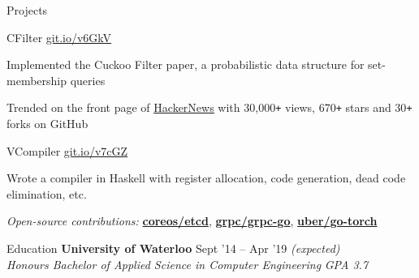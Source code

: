\documentclass{resume} %
\begin{document}
\begin{rSection}{Projects}
  \begin{rSubsection}{CFilter}
    {\href{https://git.io/v6GkV}{git.io/v6GkV}}
                     {}{}
     \item Implemented the Cuckoo Filter paper, a probabilistic data structure for
       set-membership queries
     \item Trended on the front page of
       \href{https://news.ycombinator.com/item?id=12241332}{\underline
       {HackerNews}} with 30,000\texttt{+} views, 670\texttt{+} stars and
       30\texttt{+} forks on GitHub
  \end{rSubsection}

  \begin{rSubsection}{VCompiler}
    {\href{https://git.io/v7cGZ}{git.io/v7cGZ}}
                     {}{}
                   \item Wrote a compiler in Haskell with register allocation, code generation,
                     dead code elimination, etc.
  \end{rSubsection}

  \begin{rMinisection}
    \item {\em Open-source contributions:}
      \href{https://github.com/coreos/etcd/pull/8288}{\textbf{coreos/etcd}},
      \href{https://github.com/grpc/grpc-go/pull/1478}{\textbf{grpc/grpc-go}},
      \href{https://github.com/uber/go-torch/pull/62}{\textbf{uber/go-torch}}
  \end{rMinisection}
\end{rSection}


\begin{rSection}{Education}
  {\bf University of Waterloo} \hfill {Sept '14 -- Apr '19 \em (expected)} \\
  {\em Honours Bachelor of Applied Science in Computer Engineering} \hfill {\em GPA 3.7}
  \vspace{0.5em}
\end{rSection}
\end{document}
